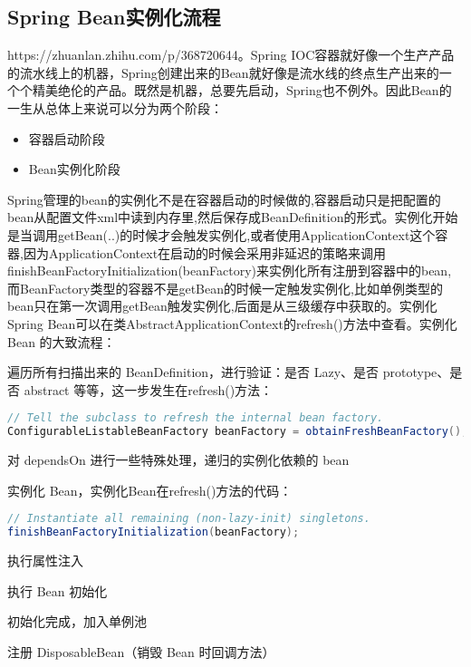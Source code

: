 \documentclass[../../../interview-questions.tex]{subfiles}
\begin{document}
\subsection{Spring Bean实例化流程}

https://zhuanlan.zhihu.com/p/368720644。Spring IOC容器就好像一个生产产品的流水线上的机器，Spring创建出来的Bean就好像是流水线的终点生产出来的一个个精美绝伦的产品。既然是机器，总要先启动，Spring也不例外。因此Bean的一生从总体上来说可以分为两个阶段：

\begin{itemize}
    \item {容器启动阶段}
    \item {Bean实例化阶段}
\end{itemize}

Spring管理的bean的实例化不是在容器启动的时候做的,容器启动只是把配置的bean从配置文件xml中读到内存里,然后保存成BeanDefinition的形式。实例化开始是当调用getBean(..)的时候才会触发实例化,或者使用ApplicationContext这个容器,因为ApplicationContext在启动的时候会采用非延迟的策略来调用finishBeanFactoryInitialization(beanFactory)来实例化所有注册到容器中的bean,而BeanFactory类型的容器不是getBean的时候一定触发实例化,比如单例类型的bean只在第一次调用getBean触发实例化,后面是从三级缓存中获取的。实例化Spring Bean可以在类AbstractApplicationContext的refresh()方法中查看。实例化 Bean 的大致流程：

遍历所有扫描出来的 BeanDefinition，进行验证：是否 Lazy、是否 prototype、是否 abstract 等等，这一步发生在refresh()方法：

\begin{lstlisting}[language=Java]
// Tell the subclass to refresh the internal bean factory.
ConfigurableListableBeanFactory beanFactory = obtainFreshBeanFactory();  
\end{lstlisting}

对 dependsOn 进行一些特殊处理，递归的实例化依赖的 bean

实例化 Bean，实例化Bean在refresh()方法的代码：

\begin{lstlisting}[language=Java]
// Instantiate all remaining (non-lazy-init) singletons.
finishBeanFactoryInitialization(beanFactory);    
\end{lstlisting}


执行属性注入

执行 Bean 初始化

初始化完成，加入单例池

注册 DisposableBean（销毁 Bean 时回调方法）
\end{document}
